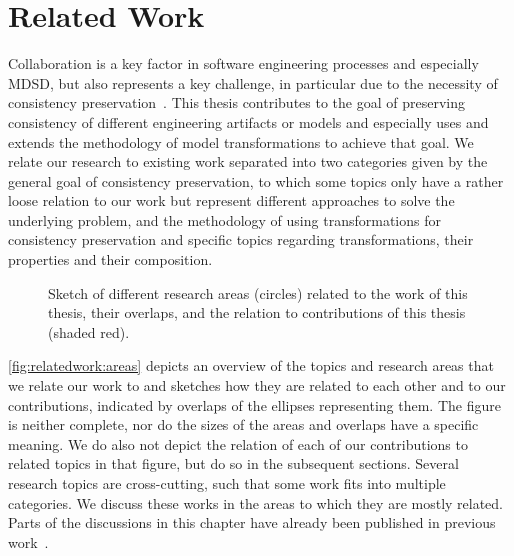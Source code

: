 \chapter{Related Work
}
\label{chap:relatedwork}

Collaboration is a key factor in software engineering processes and especially \gls{MDSD}, but also represents a key challenge, in particular due to the necessity of consistency preservation~\cite{franzago2018mdseChallenges-TSE}.
This thesis contributes to the goal of preserving consistency of different engineering artifacts or models and especially uses and extends the methodology of model transformations to achieve that goal.
We relate our research to existing work separated into two categories given by the general goal of consistency preservation, to which some topics only have a rather loose relation to our work but represent different approaches to solve the underlying problem, and the methodology of using transformations for consistency preservation and specific topics regarding transformations, their properties and their composition.

\begin{figure}
    \centering
    
    \caption[Overlaps of related research areas]{Sketch of different research areas (circles) related to the work of this thesis, their overlaps, and the relation to contributions of this thesis (shaded red).}
    \label{fig:relatedwork:areas}
\end{figure}

\autoref{fig:relatedwork:areas} depicts an overview of the topics and research areas that we relate our work to and sketches how they are related to each other and to our contributions, indicated by overlaps of the ellipses representing them.
The figure is neither complete, nor do the sizes of the areas and overlaps have a specific meaning.
We do also not depict the relation of each of our contributions to related topics in that figure, but do so in the subsequent sections.
Several research topics are cross-cutting, such that some work fits into multiple categories.
We discuss these works in the areas to which they are mostly related.
Parts of the discussions in this chapter have already been published in previous work~.


